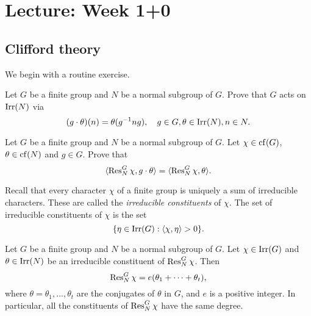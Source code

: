 \section{Lecture: Week 1+0}

\subsection{Clifford theory}

We begin with a routine exercise. 


\begin{exercise}
\label{xca:conjugate_chars1}
Let $G$ be a finite group and $N$ be a normal subgroup
of $G$. Prove that $G$ acts on $\operatorname{Irr}(N)$ via 
\[
(g\cdot\theta)(n)=\theta(g^{-1}ng),\quad 
g\in G,\theta\in\operatorname{Irr}(N),n\in N.
\]
\end{exercise}

\begin{exercise}
\label{xca:conjugate_chars2}
Let $G$ be a finite group and $N$ be a normal subgroup of $G$. 
Let $\chi\in\operatorname{cf}(G)$, $\theta\in\operatorname{cf}(N)$ and $g\in G$. Prove that
\[
\langle\operatorname{Res}_N^G\chi,g\cdot\theta\rangle=\langle\operatorname{Res}_N^G\chi,\theta\rangle.
\]
\end{exercise}

Recall that every character $\chi$ of a finite group is uniquely 
a sum of irreducible characters. These are called
the \emph{irreducible constituents} of $\chi$. The set 
of irreducible constituents of $\chi$ is the set  
\[
\{\eta\in\operatorname{Irr}(G):\langle\chi,\eta\rangle>0\}.
\]

\begin{theorem}[Clifford]
\label{thm:Clifford}
    Let $G$ be a finite group and $N$ be a normal
    subgroup of $G$. Let $\chi\in\operatorname{Irr}(G)$ and $\theta\in\operatorname{Irr}(N)$ be 
    an irreducible constituent of $\operatorname{Res}_N^G\chi$. 
    Then 
    \[
    \operatorname{Res}_N^G\chi = e(\theta_1+\cdots+\theta_t),
    \]
    where $\theta=\theta_1,\dots,\theta_t$ are the conjugates 
    of $\theta$ in $G$, 
    and $e$ is a positive integer. In particular, all the constituents of $\operatorname{Res}_N^G\chi$ have the same degree. 
\end{theorem}

